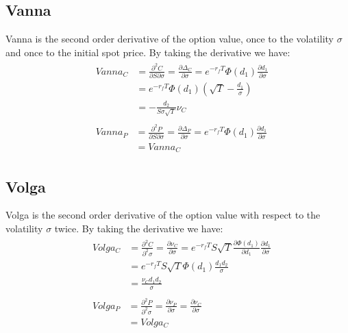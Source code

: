 \subsection{Vanna}
Vanna is the second order derivative of the option value, once to the volatility $\sigma$ and once to the initial spot price. 
\newline
\newline
By taking the derivative we have:
\begin{align}
&\begin{aligned}
Vanna_C &= \frac{\partial^2 C}{\partial S \partial \sigma} = \frac{\partial \Delta_C}{\partial \sigma} = e^{-r_fT}\varPhi(d_1)\frac{\partial d_1}{\partial \sigma} \\
&= e^{-r_fT}\varPhi(d_1)\left( \sqrt{T} - \frac{d_1}{\sigma}\right) \\
&= -\frac{d_2}{S\sigma \sqrt{T}}\nu_C
\end{aligned} \\
&\begin{aligned}
Vanna_P &= \frac{\partial^2 P}{\partial S \partial \sigma} = \frac{\partial \Delta_P}{\partial \sigma} = e^{-r_fT}\varPhi(d_1)\frac{\partial d_1}{\partial \sigma} \\
&= Vanna_C
\end{aligned}
\end{align}

\subsection{Volga}
Volga is the second order derivative of the option value with respect to the volatility $\sigma$ twice. 
\newline
\newline
By taking the derivative we have:
\begin{align}
&\begin{aligned}
Volga_C &= \frac{\partial^2 C}{\partial^2 \sigma} = \frac{\partial \nu_C}{\partial \sigma} = e^{-r_fT}S\sqrt{T}\frac{\partial \varPhi(d_1)}{\partial d_1}\frac{\partial d_1}{\partial \sigma} \\
&= e^{-r_fT}S\sqrt{T}\varPhi(d_1)\frac{d_1d_2}{\sigma} \\
&= \frac{\nu_C d_1d_2}{\sigma}
\end{aligned} \\
&\begin{aligned}
Volga_P &= \frac{\partial^2 P}{\partial^2 \sigma} = \frac{\partial \nu_P}{\partial \sigma} = \frac{\partial \nu_C}{\partial \sigma}  \\
&= Volga_C
\end{aligned}
\end{align}

